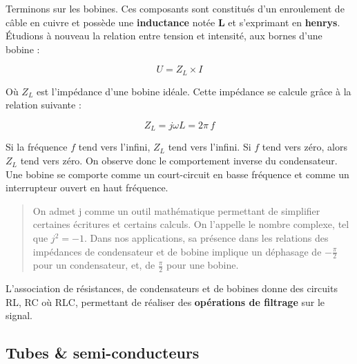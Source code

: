 \documentclass[
]{book}
\begin{document}
Terminons sur les bobines. Ces composants sont constitués d'un enroulement de câble en cuivre et possède une \textbf{inductance} notée \textbf{L} et s'exprimant en \textbf{henrys}. Étudions à nouveau la relation entre tension et intensité, aux bornes d'une bobine :

\[ U = Z_L \times I \]

Où \(Z_L\) est l'impédance d'une bobine idéale. Cette impédance se calcule grâce à la relation suivante :

\[ Z_L = j\omega L = 2 \pi \, f \]

Si la fréquence \(f\) tend vers l'infini, \(Z_L\) tend vers l'infini. Si \(f\) tend vers zéro, alors \(Z_L\) tend vers zéro. On observe donc le comportement inverse du condensateur. Une bobine se comporte comme un court-circuit en basse fréquence et comme un interrupteur ouvert en haut fréquence.

\begin{quote}
On admet j comme un outil mathématique permettant de simplifier certaines écritures et certains calculs. On l'appelle le nombre complexe, tel que \(j^2 = -1\). Dans nos applications, sa présence dans les relations des impédances de condensateur et de bobine implique un déphasage de \(-\frac{\pi}{2}\) pour un condensateur, et, de \(\frac{\pi}{2}\) pour une bobine.
\end{quote}

L'association de résistances, de condensateurs et de bobines donne des circuits RL, RC où RLC, permettant de réaliser des \textbf{opérations de filtrage} sur le signal.

\hypertarget{tubes-semi-conducteurs}{%
\subsection{Tubes \& semi-conducteurs}\label{tubes-semi-conducteurs}}
\end{document}

